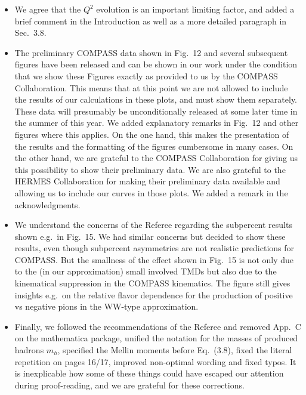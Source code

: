 \documentclass[a4paper,11pt]{article}
\begin{document}
\begin{itemize}

\item	We agree that the $Q^2$ evolution is an important 
	limiting factor, and added a brief comment in the
	Introduction as well as a more detailed paragraph
	in Sec.~3.8.

\item	The preliminary COMPASS data shown in Fig.~12 and
	several subsequent figures have been released and
	can be shown in our work under the condition that
	we show these Figures exactly as provided to us
	by the COMPASS Collaboration. This means that at
	this point we are not allowed to include the 
	results of our calculations in these plots, and
	must show them separately. These data will 
	presumably be unconditionally released at some later 
	time in the summer of this year. We added explanatory
	remarks in Fig.~12 and other figures where this applies.
	On the one hand, this makes the presentation of the
	results and the formatting of the figures cumbersome
	in many cases. On the other hand, we are grateful
	to the COMPASS Collaboration for giving us this
	possibility to show their preliminary data.
	We are also grateful to the HERMES Collaboration
	for making their preliminary data available and
	allowing us to include our curves in those plots.
	We added a remark in the acknowledgments.

\item	We understand the concerns of the Referee regarding the 
	subpercent results shown e.g.\ in Fig.~15. We had similar
	concerns but decided to show these results, even though
	subpercent asymmetries are not realistic predictions for 
	COMPASS. But the smallness of the effect shown in Fig.~15 is 
	not only due to the (in our approximation) small involved 
	TMDs but also due to the kinematical suppression in the
	COMPASS kinematics. The figure still gives insights e.g.\ 
	on the relative flavor dependence for the production of 
	positive vs negative pions in the WW-type approximation.

\item	Finally, we followed the recommendations of the Referee
	and removed App.~C on the mathematica package, unified 
	the notation for the masses of produced hadrons $m_h$, 
	specified the Mellin moments before Eq.~(3.8), fixed 
	the literal repetition on pages 16/17, improved
	non-optimal wording and fixed typos. It is inexplicable
	how some of these things could have escaped our attention 
	during proof-reading, and we are grateful for these corrections.

\end{itemize}
\end{document}
